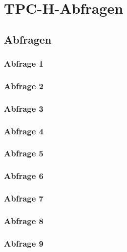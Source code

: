 \chapter{TPC-H-Abfragen}
\section{Abfragen}
\subsection*{Abfrage 1}

\subsection*{Abfrage 2}

\newpage
\subsection*{Abfrage 3}

\subsection*{Abfrage 4}

\subsection*{Abfrage 5}

\subsection*{Abfrage 6}

\subsection*{Abfrage 7}

\subsection*{Abfrage 8}

\subsection*{Abfrage 9}

